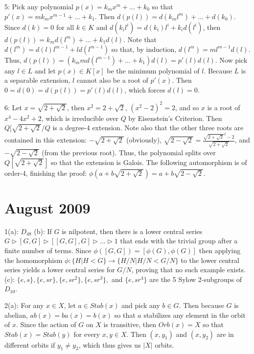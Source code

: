 \documentclass[12pt]{article}
\begin{document}
5: Pick any polynomial $p(x) = k_m x^m + ... + k_0$ so that $p'(x) = m k_m x^{m-1} + ... + k_1$. Then $d(p(l)) = d(k_m l^m) + ... + d(k_0)$. Since $d(k)=0$ for all $k \in K$ and $d(k_i l^i) = d(k_i) l^i + k_i d(l^i)$, then $d(p(l)) = k_m d(l^m) + ... + k_1 d(l)$. Note that $d(l^m)=d(l)l^{m-1}+ld(l^{m-1})$ so that, by induction, $d(l^m)=m l^{m-1} d(l)$. Thus, $d(p(l))=(k_m m d(l^{m-1}) + ... + k_1) d(l) = p'(l)d(l)$. Now pick any $l \in L$ and let $p(x) \in K[x]$ be the minimum polynomial of $l$. Because $L$ is a separable extension, $l$ cannot also be a root of $p'(x)$. Then $0 = d(0) = d(p(l)) = p'(l) d(l)$, which forces $d(l) = 0$. \newline

6: Let $x=\sqrt{2+\sqrt{2}}$, then $x^2=2+\sqrt{2}$, $(x^2-2)^2=2$, and so $x$ is a root of $x^4-4x^2+2$, which is irreducible over $Q$ by Eisenstein's Criterion. Then $Q[\sqrt{2+\sqrt{2}}/Q$ is a degree-4 extension. Note also that the other three roots are contained in this extension: $-\sqrt{2+\sqrt{2}}$ (obviously), $\sqrt{2-\sqrt{2}}=\frac{\sqrt{2+\sqrt{2}}^2-2}{\sqrt{2+\sqrt{2}}}$, and $-\sqrt{2-\sqrt{2}}$ (from the previous root). Thus, the polynomial splits over $Q[\sqrt{2+\sqrt{2}}]$ so that the extension is Galois. The following automorphism is of order-4, finishing the proof: $\phi(a+b\sqrt{2+\sqrt{2}})=a+b\sqrt{2-\sqrt{2}}$.

\section{August 2009}

1(a): $D_{48}$ (b): If $G$ is nilpotent, then there is a lower central series $G \triangleright [G,G] \triangleright [[G,G],G] \triangleright ... \triangleright 1$ that ends with the trivial group after a finite number of terms. Since $\phi([G,G])=[\phi(G),\phi(G)]$ then applying the homomorphism $\phi:\{H|H<G\} \rightarrow \{H/N|H/N < G/N\}$ to the lower central series yields a lower central series for $G/N$, proving that no such example exists. (c): $\{e,s\},\{e,sr\},\{e,sr^2\},\{e,sr^3\},$ and $\{e,sr^4\}$ are the 5 Sylow 2-subgroups of $D_{10}$. \newline

2(a): For any $x \in X$, let $a \in Stab(x)$ and pick any $b \in G$. Then because $G$ is abelian, $ab(x)=ba(x)=b(x)$ so that $a$ stabilizes any element in the orbit of $x$. Since the action of $G$ on $X$ is transitive, then $Orb(x)=X$ so that $Stab(x)=Stab(y)$ for every $x,y \in X$. Then $(x,y_1)$ and $(x,y_2)$ are in different orbits if $y_1 \neq y_2$, which thus gives us $|X|$ orbits. \newline
\end{document}

